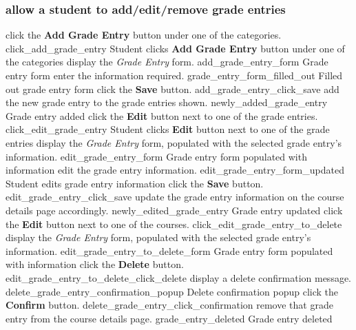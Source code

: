 \documentclass[12pt]{article}
\newenvironment{requirement}[1]
{
    \renewcommand{\thesubsubsection}{R\arabic{subsubsection}.}
    \renewcommand{\labelenumi}{
        \arabic{subsubsection}.\arabic{enumi}
    }
    \renewcommand{\labelenumii}{
        \arabic{subsubsection}.\arabic{enumi}.\arabic{enumii}
    }
    \renewcommand{\labelenumiii}{
        \arabic{subsubsection}.\arabic{enumi}.\arabic{enumii}.\arabic{enumiii}
    }
    \renewcommand{\labelenumiv}{
        \arabic{subsubsection}.\arabic{enumi}.\arabic{enumii}.\arabic{enumiii}.\arabic{enumiv}
    }
    \subsubsection{#1}
    \begin{enumerate}
}
{
    \end{enumerate}
}
\begin{document}
\begin{requirement}{\sysshall allow a student to add/edit/remove grade entries}
    \navcoursedetails
    \screenshotstep
      {\stushall click the \textbf{Add Grade Entry} button under one of the categories.}
      {click_add_grade_entry}
      {Student clicks \textbf{Add Grade Entry} button under one of the categories}
    \screenshotstep
      {\sysshall display the \emph{Grade Entry} form.}
      {add_grade_entry_form}
      {Grade entry form}
    \screenshotstep
      {\stushall enter the information required.}
      {grade_entry_form_filled_out}
      {Filled out grade entry form}
    \screenshotstep
      {\stushall click the \textbf{Save} button.}
      {add_grade_entry_click_save}
      {}
    \screenshotstep
      {\sysshall add the new grade entry to the grade entries shown.}
      {newly_added_grade_entry}
      {Grade entry added}
    \screenshotstep
      {\stushall click the \textbf{Edit} button next to one of the grade entries.}
      {click_edit_grade_entry}
      {Student clicks \textbf{Edit} button next to one of the grade entries}
    \screenshotstep
      {\sysshall display the \emph{Grade Entry} form, populated with the selected grade entry's
      information.}
      {edit_grade_entry_form}
      {Grade entry form populated with information}
    \screenshotstep
      {\stushall edit the grade entry information.}
      {edit_grade_entry_form_updated}
      {Student edits grade entry information}
    \screenshotstep
      {\stushall click the \textbf{Save} button.}
      {edit_grade_entry_click_save}
      {}
    \screenshotstep
      {\sysshall update the grade entry information on the course details page accordingly.}
      {newly_edited_grade_entry}
      {Grade entry updated}
    \screenshotstep
      {\stushall click the \textbf{Edit} button next to one of the courses.}
      {click_edit_grade_entry_to_delete}
      {}
    \screenshotstep
      {\sysshall display the \emph{Grade Entry} form, populated with the selected grade entry's
      information.}
      {edit_grade_entry_to_delete_form}
      {Grade entry form populated with information}
    \screenshotstep
      {\stushall click the \textbf{Delete} button.}
      {edit_grade_entry_to_delete_click_delete}
      {}
    \screenshotstep
      {\sysshall display a delete confirmation message.}
      {delete_grade_entry_confirmation_popup}
      {Delete confirmation popup}
    \screenshotstep
      {\stushall click the \textbf{Confirm} button.}
      {delete_grade_entry_click_confirmation}
      {}
    \screenshotstep
      {\sysshall remove that grade entry from the course details page.}
      {grade_entry_deleted}
      {Grade entry deleted}
\end{requirement}
\end{document}
